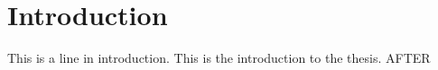 \chapter{Introduction}
This is a line in introduction.
This is the introduction to the thesis. 
AFTER